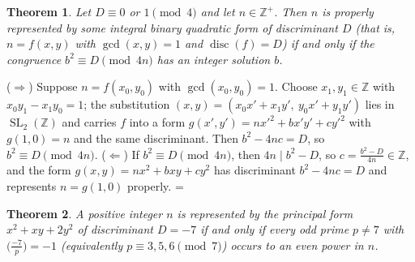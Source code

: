 \documentclass[11pt]{article}
\makeatletter
\let\nt@closedisplay\]
\def\nt@guardedclose{\@ifnextchar\par{\nt@closeafterpar}{\@ifnextchar\end{\postdisplaypenalty\@M\nt@closedisplay}{\nt@closedisplay}}}
\def\nt@closeafterpar\par{\@ifnextchar\par{\nt@closeafterpar}{\@ifnextchar\end{\postdisplaypenalty\@M\nt@closedisplay\par}{\nt@closedisplay\par}}}
\renewenvironment{proof}[1][\proofname]{\par
  \pushQED{\qed}\normalfont\topsep\medskipamount\edef\nt@afterproof{\@endparpenalty=\the\@endparpenalty\relax}\@beginparpenalty\@M\@endparpenalty\@M\let\]\nt@guardedclose\trivlist\item[]\textit{#1\@addpunct{.}} \ignorespaces}{\ifvmode\addpenalty\@M\fi\popQED\nt@afterproof\endtrivlist\@endpefalse}
\theoremstyle{ntstyle}
\newtheorem{theorem}{Theorem}[subsection]
\newcommand{\legs}[2]{\bigl(\tfrac{#1}{#2}\bigr)}
\DeclareMathOperator{\disc}{disc}
\makeatother
\begin{document}
\begin{theorem}\label{thm:8.6.6}
  Let $D \equiv 0$ or $1 \pmod{4}$ and let $n \in \mathbb{Z}^+$. Then
  $n$ is properly represented by some integral binary quadratic form of
  discriminant $D$ (that is, $n = f(x, y)$ with $\gcd(x, y) = 1$ and
  $\disc(f) = D$) if and only if the congruence $b^2\equiv D\pmod{4n}$ has an integer solution $b$.

\end{theorem}

\begin{proof} ($\Rightarrow$) Suppose $n = f(x_0, y_0)$
  with $\gcd(x_0, y_0) = 1$. Choose $x_1, y_1 \in \mathbb{Z}$ with $x_0 y_1 - x_1 y_0 = 1$; the substitution
  $(x, y) = (x_0 x' + x_1 y',\ y_0 x' + y_1 y')$ lies in $\operatorname{SL}_2(\mathbb{Z})$ and carries
  $f$ into a form $g(x', y') = n x'^{2} + b x'y' + c y'^{2}$ with $g(1, 0) = n$ and the same discriminant. Then
  $b^{2} - 4nc = D$, so $b^{2} \equiv D \pmod{4n}$. ($\Leftarrow$) If $b^{2} \equiv D \pmod{4n}$,
  then $4n \mid b^{2} - D$, so $c = \tfrac{b^{2} - D}{4n} \in \mathbb{Z}$, and the form
  $g(x, y) = n x^{2} + b xy + c y^{2}$ has
  discriminant $b^{2} - 4nc = D$ and represents $n = g(1, 0)$ properly.
\end{proof}

\begin{theorem}\label{thm:8.6.7} A positive integer $n$ is represented by the
  principal form $x^{2} + xy + 2y^{2}$ of discriminant $D = -7$ if and
  only if every odd prime $p\neq 7$ with $\legs{-7}{p} = -1$
  (equivalently $p \equiv 3, 5, 6 \pmod{7}$) occurs to an even power in $n$.

\end{theorem}
\end{document}
